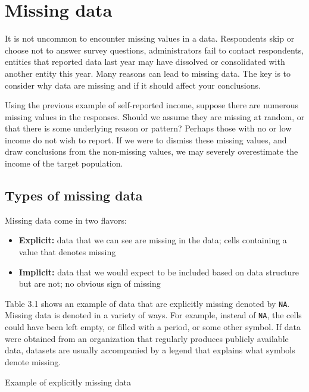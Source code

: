 \documentclass[
]{book}
\providecommand{\tightlist}{%
  \setlength{\itemsep}{0pt}\setlength{\parskip}{0pt}}
\begin{document}
\hypertarget{missing-data}{%
\section{Missing data}\label{missing-data}}

It is not uncommon to encounter missing values in a data. Respondents skip or choose not to answer survey questions, administrators fail to contact respondents, entities that reported data last year may have dissolved or consolidated with another entity this year. Many reasons can lead to missing data. The key is to consider why data are missing and if it should affect your conclusions.

Using the previous example of self-reported income, suppose there are numerous missing values in the responses. Should we assume they are missing at random, or that there is some underlying reason or pattern? Perhaps those with no or low income do not wish to report. If we were to dismiss these missing values, and draw conclusions from the non-missing values, we may severely overestimate the income of the target population.

\hypertarget{types-of-missing-data}{%
\subsection{Types of missing data}\label{types-of-missing-data}}

Missing data come in two flavors:

\begin{itemize}
\tightlist
\item
  \textbf{Explicit:} data that we can see are missing in the data; cells containing a value that denotes missing
\item
  \textbf{Implicit:} data that we would expect to be included based on data structure but are not; no obvious sign of missing
\end{itemize}

Table 3.1 shows an example of data that are explicitly missing denoted by \texttt{NA}. Missing data is denoted in a variety of ways. For example, instead of \texttt{NA}, the cells could have been left empty, or filled with a period, or some other symbol. If data were obtained from an organization that regularly produces publicly available data, datasets are usually accompanied by a legend that explains what symbols denote missing.

\label{tab:unnamed-chunk-8}Example of explicitly missing data
\end{document}
